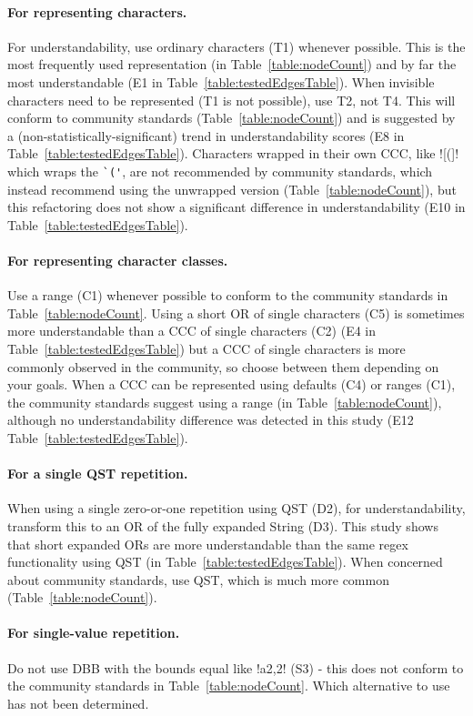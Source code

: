 \paragraph{For representing characters.}  For understandability, use ordinary characters (T1) whenever possible.  This is the most frequently used representation (in Table~\ref{table:nodeCount}) and by far the most understandable (E1 in Table~\ref{table:testedEdgesTable}).  When invisible characters need to be represented (T1 is not possible), use T2, not T4.  This will conform to community standards (Table~\ref{table:nodeCount}) and is suggested by a (non-statistically-significant) trend in understandability scores (E8 in Table~\ref{table:testedEdgesTable}).  Characters wrapped in their own CCC, like \cverb![(]! which wraps the \verb!`('!, are not recommended by community standards, which instead recommend using the unwrapped version (Table~\ref{table:nodeCount}), but this refactoring does not show a significant difference in understandability (E10 in Table~\ref{table:testedEdgesTable}).

\paragraph{For representing character classes.}  Use a range (C1) whenever possible to conform to the community standards in Table~\ref{table:nodeCount}.  Using a short OR of single characters (C5) is sometimes more understandable than a CCC of single characters (C2) (E4 in Table~\ref{table:testedEdgesTable}) but a CCC of single characters is more commonly observed in the community, so choose between them depending on your goals.  When a CCC can be represented using defaults (C4) or ranges (C1), the community standards suggest using a range (in Table~\ref{table:nodeCount}), although no understandability difference was detected in this study (E12 Table~\ref{table:testedEdgesTable}).

\paragraph{For a single QST repetition.}  When using a single zero-or-one repetition using QST (D2), for understandability, transform this to an OR of the fully expanded String (D3).  This study shows that short expanded ORs are more understandable than the same regex functionality using QST (in Table~\ref{table:testedEdgesTable}).  When concerned about community standards, use QST, which is much more common (Table~\ref{table:nodeCount}).

\paragraph{For single-value repetition.}  Do not use DBB with the bounds equal like \cverb!a{2,2}! (S3) - this does not conform to the community standards in Table~\ref{table:nodeCount}.  Which alternative to use has not been determined.
